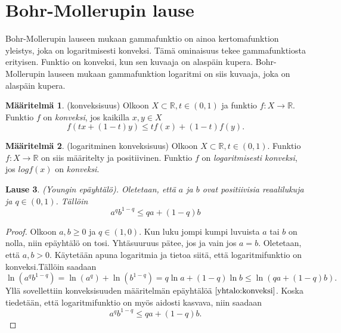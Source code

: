 \documentclass[12pt]{article}
\theoremstyle{definition}
\newtheorem{maar}{Määritelmä}
\theoremstyle{plain}
\newtheorem{lause}[maar]{Lause}
\numberwithin{equation}{section}
\begin{document}
\newpage





\section{Bohr-Mollerupin lause}
\onehalfspacing
Bohr-Mollerupin lauseen mukaan gammafunktio on ainoa kertomafunktion yleistys, joka on logaritmisesti konveksi. Tämä ominaisuus tekee gammafunktiosta erityisen. Funktio on konveksi, kun sen kuvaaja on alaspäin kupera. Bohr-Mollerupin lauseen mukaan gammafunktion logaritmi on siis kuvaaja, joka on alaspäin kupera.
\newline

\begin{maar}
(konveksisuus) \label{maar: konveksisuus}
Olkoon $X\subset\mathbb{R}, t \in (0, 1)$ ja funktio $f: X \rightarrow \mathbb{R}$. Funktio $f$ on \emph{konveksi}, jos kaikilla $x,y \in X$
\begin{equation}\label{yhtalo:konveksi}
    f(tx+(1-t)y) \le tf(x)+(1-t)f(y).
\end{equation}
\end{maar}


\begin{maar}
(logaritminen konveksisuus) \label{maar: logkonveksisuus}
Olkoon $X\subset\mathbb{R}, t \in (0, 1)$. Funktio $f: X \rightarrow \mathbb{R}$ on siis määritelty ja positiivinen. Funktio $f$ on \emph{logaritmisesti konveksi}, jos $logf(x)$ on \emph{konveksi}.
\end{maar}

\begin{lause} \label{lause: young}
(Youngin epäyhtälö). Oletetaan, että $a$ ja $b$ ovat positiivisia reaalilukuja ja $q \in (0,1)$. Tällöin
\begin{equation}
    a^{q}b^{1-q} \le qa+(1-q)b
\end{equation}
\end{lause}
\begin{proof}
Olkoon $a,b \ge 0$ ja $q \in (1,0)$. Kun luku jompi kumpi luvuista $a$ tai $b$ on nolla, niin epäyhtälö on tosi. Yhtäsuuruus pätee, jos ja vain jos $a=b$. Oletetaan, että $a,b > 0$. Käytetään apuna logaritmia ja tietoa siitä, että logaritmifunktio on konveksi.Tällöin saadaan
\begin{equation*}
    \ln(a^{q}b^{1-q}) = \ln(a^q) + \ln(b^{1-q}) = q \ln a+(1-q)\ln b \le \ln(qa+(1-q)b).
\end{equation*}
Yllä sovellettiin konveksisuuden määritelmän epäyhtälöä $\eqref{yhtalo:konveksi}$. Koska tiedetään, että logaritmifunktio on myös aidosti kasvava, niin saadaan 
\begin{equation*}
    a^{q}b^{1-q}\le qa+(1-q)b.
\end{equation*}
\end{proof}
\end{document}
